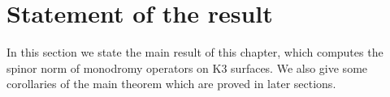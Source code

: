 

\section{Statement of the result}
%
In this section we state the main result of this chapter, which computes the spinor norm of monodromy operators on K3 surfaces. We also give some corollaries of the main theorem which are proved in later sections.

